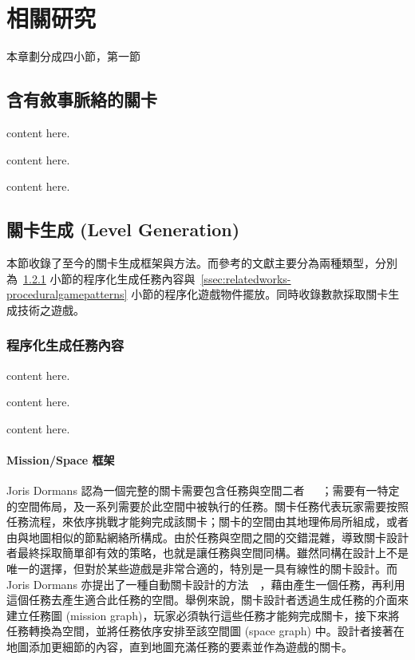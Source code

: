 \chapter{相關研究}
\label{cha:relatedworks}

本章劃分成四小節，第一節



\section{含有敘事脈絡的關卡}

content here.

content here.

content here.

\section{關卡生成 (Level Generation)}
\label{sec:relatedworks-levelgeneration}

本節收錄了至今的關卡生成框架與方法。而參考的文獻主要分為兩種類型，分別為~\ref{ssec:relatedworks-proceduralmission} 小節的程序化生成任務內容與~\ref{ssec:relatedworks-proceduralgamepatterns} 小節的程序化遊戲物件擺放。同時收錄數款採取關卡生成技術之遊戲。

\subsection{程序化生成任務內容}
\label{ssec:relatedworks-proceduralmission}

content here.

content here.

content here.

\subsubsection{Mission/Space 框架}
\label{sssec:relatedworks-proceduralmission-missionspace}

Joris Dormans 認為一個完整的關卡需要包含任務與空間二者~\cite{dormans2010adventures}~\cite{dormans2011level}~\cite{dormans2012engineering}；需要有一特定的空間佈局，及一系列需要於此空間中被執行的任務。關卡任務代表玩家需要按照任務流程，來依序挑戰才能夠完成該關卡；關卡的空間由其地理佈局所組成，或者由與地圖相似的節點網絡所構成。由於任務與空間之間的交錯混雜，導致關卡設計者最終採取簡單卻有效的策略，也就是讓任務與空間同構。雖然同構在設計上不是唯一的選擇，但對於某些遊戲是非常合適的，特別是一具有線性的關卡設計。而 Joris Dormans 亦提出了一種自動關卡設計的方法~\cite{dormans2010adventures}~\cite{dormans2012engineering}，藉由產生一個任務，再利用這個任務去產生適合此任務的空間。舉例來說，關卡設計者透過生成任務的介面來建立任務圖 (mission graph)，玩家必須執行這些任務才能夠完成關卡，接下來將任務轉換為空間，並將任務依序安排至該空間圖 (space graph) 中。設計者接著在地圖添加更細節的內容，直到地圖充滿任務的要素並作為遊戲的關卡。

